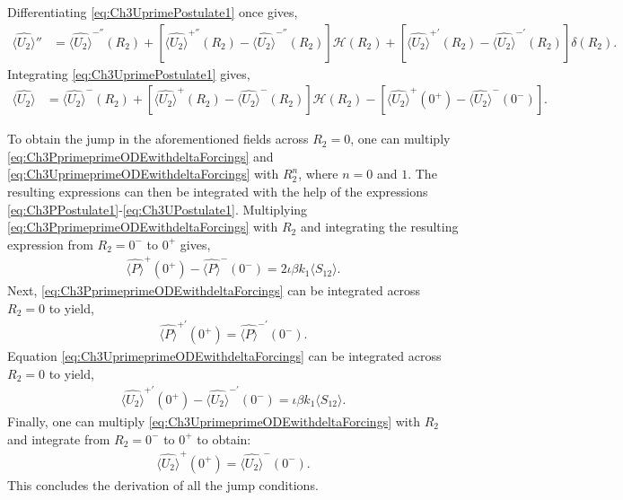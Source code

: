 \documentclass{jfm}
\begin{document}
Differentiating \eqref{eq:Ch3UprimePostulate1} once gives,
\begin{align}
\hat{\langle U_2\rangle}''&=\hat{\langle U_2\rangle}^{-''}(R_2)+[\hat{\langle U_2\rangle}^{+''}(R_2)-\hat{\langle U_2\rangle}^{-''}(R_2)]\mathcal{H}(R_2)+[\hat{\langle U_2\rangle}^{+'}(R_2)-\hat{\langle U_2\rangle}^{-'}(R_2)]\delta(R_2).
\label{eq:Ch3UprimeprimePostulate1}
\end{align}
Integrating \eqref{eq:Ch3UprimePostulate1} gives,
\begin{align}
\hat{\langle U_2\rangle}&=\hat{\langle U_2\rangle}^{-}(R_2)+[\hat{\langle U_2\rangle}^{+}(R_2)-\hat{\langle U_2\rangle}^{-}(R_2)]\mathcal{H}(R_2)-[\hat{\langle U_2\rangle}^{+}(0^+)-\hat{\langle U_2\rangle}^{-}(0^-)].
\label{eq:Ch3UPostulate1}
\end{align}

To obtain the jump in the aforementioned fields across $R_2 = 0$, one can multiply \eqref{eq:Ch3PprimeprimeODEwithdeltaForcings} and \eqref{eq:Ch3UprimeprimeODEwithdeltaForcings} with $R_2^n$, where $n=0$ and $1$. The resulting expressions can then be integrated with the help of the expressions \eqref{eq:Ch3PPostulate1}-\eqref{eq:Ch3UPostulate1}. Multiplying \eqref{eq:Ch3PprimeprimeODEwithdeltaForcings} with $R_2$ and integrating the resulting expression from $R_2=0^-$ to $0^+$ gives,
\begin{align}
\hat{\langle P\rangle}^+(0^+)-\hat{\langle P\rangle}^-(0^-)=2\iota \beta k_1 \langle S_{12}\rangle.
\label{eq:Ch3JumpP}
\end{align}
Next, \eqref{eq:Ch3PprimeprimeODEwithdeltaForcings} can be integrated across $R_2 =0$ to yield,
\begin{align}
\hat{\langle P\rangle}^{+'}(0^+)=\hat{\langle P\rangle}^{-'}(0^-).
\label{eq:Ch3JumpPprime}
\end{align}
Equation \eqref{eq:Ch3UprimeprimeODEwithdeltaForcings} can be integrated across $R_2 =0$ to yield,
\begin{align}
\hat{\langle U_2\rangle}^{+'}(0^+)-\hat{\langle U_2\rangle}^{-'}(0^-)=\iota \beta k_1 \langle S_{12}\rangle.
\label{eq:Ch3JumpUprime}	
\end{align}
Finally, one can multiply \eqref{eq:Ch3UprimeprimeODEwithdeltaForcings} with $R_2$ and integrate from $R_2=0^-$ to $0^+$ to obtain:
\begin{align}
\hat{\langle U_2\rangle}^{+}(0^+)=\hat{\langle U_2\rangle}^{-}(0^-).
\label{eq:Ch3JumpU}	
\end{align}
This concludes the derivation of all the jump conditions.
\end{document}
